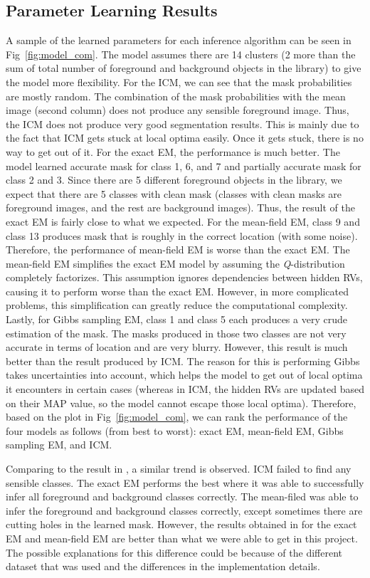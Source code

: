 \documentclass{article} %
\begin{document}
\subsection{Parameter Learning Results}
\label{parameter_result}
A sample of the learned parameters for each inference algorithm can be seen in Fig~\ref{fig:model_com}. The model assumes there are 14 clusters (2 more than the sum of total number of foreground and background objects in the library) to give the model more flexibility. For the ICM, we can see that the mask probabilities are mostly random. The combination of the mask probabilities with the mean image (second column) does not produce any sensible foreground image. Thus, the ICM does not produce very good segmentation results. This is mainly due to the fact that ICM gets stuck at local optima easily. Once it gets stuck, there is no way to get out of it. For the exact EM, the performance is much better. The model learned accurate mask for class 1, 6, and 7 and partially accurate mask for class 2 and 3. Since there are 5 different foreground objects in the library, we expect that there are 5 classes with clean mask (classes with clean masks are foreground images, and the rest are background images). Thus, the result of the exact EM is fairly close to what we expected. For the mean-field EM, class 9 and class 13 produces mask that is roughly in the correct location (with some noise). Therefore, the performance of mean-field EM is worse than the exact EM. The mean-field EM simplifies the exact EM model by assuming the \textit{Q}-distribution completely factorizes. This assumption ignores dependencies between hidden RVs, causing it to perform worse than the exact EM. However, in more complicated problems, this simplification can greatly reduce the computational complexity. Lastly, for Gibbs sampling EM, class 1 and class 5 each produces a very crude estimation of the mask. The masks produced in those two classes are not very accurate in terms of location and are very blurry. However, this result is much better than the result produced by ICM. The reason for this is performing Gibbs takes uncertainties into account, which helps the model to get out of local optima it encounters in certain cases (whereas in ICM, the hidden RVs are updated based on their MAP value, so the model cannot escape those local optima). Therefore, based on the plot in Fig~\ref{fig:model_com}, we can rank the performance of the four models as follows (from best to worst): exact EM, mean-field EM, Gibbs sampling EM, and ICM.

Comparing to the result in \cite{b2}, a similar trend is observed. ICM failed to find any sensible classes. The exact EM performs the best where it was able to successfully infer all foreground and background classes correctly. The mean-filed was able to infer the foreground and background classes correctly, except sometimes there are cutting holes in the learned mask. However, the results obtained in \cite{b2} for the exact EM and mean-field EM are better than what we were able to get in this project. The possible explanations for this difference could be because of the different dataset that was used and the differences in the implementation details.
\end{document}
